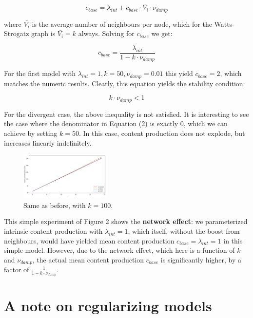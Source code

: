 \documentclass[final,5p,times,twocolumn,authoryear]{elsarticle}
\begin{document}
\begin{equation}
    c_{base} = \lambda_{int} + c_{base} \cdot \bar{V_i} \cdot \nu_{damp}
\end{equation}

where $\bar{V_i}$ is the average number of neighbours per node, which for the Watts-Strogatz graph is $\bar{V_i} = k$ always. Solving for $c_{base}$ we get:

\begin{equation}
    c_{base} = \frac{\lambda_{int}}{ 1 - k \cdot \nu_{damp} }
\end{equation}

For the first model with $\lambda_{int} = 1, k = 50, \nu_{damp} = 0.01$ this yield $c_{base}=2$, which matches the numeric results. Clearly, this equation yields the stability condition:

\begin{equation}
    k \cdot \nu_{damp} < 1
\end{equation}

For the divergent case, the above inequality is not satisfied. It is interesting to see the case where the denominator in Equation (2) is exactly 0, which we can achieve by setting $k=50$. In this case, content production does not explode, but increases linearly indefinitely.

\begin{figure}[h]
	\centering 
	\includegraphics[width=0.4\textwidth]{figure-5.png}	
	\caption{Same as before, with $k=100$.} 
\end{figure}

This simple experiment of Figure 2 shows the \textbf{network effect}: we parameterized intrinsic content production with $\lambda_{int}=1$, which itself, without the boost from neighbours, would have yielded mean content production $c_{base} = \lambda_{int} = 1 $ in this simple model. However, due to the network effect, which here is a function of $k$ and $\nu_{damp}$, the actual mean content production $c_{base}$ is significantly higher, by a factor of $ \frac{ 1 }{ 1 - k \cdot \nu_{damp} } $.

\section{A note on regularizing models}
\end{document}
